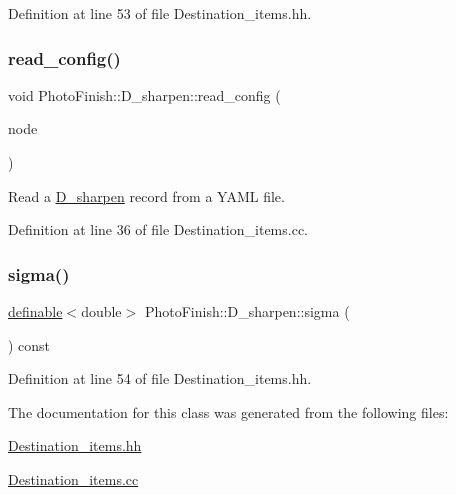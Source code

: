 Definition at line 53 of file Destination\+\_\+items.\+hh.

\mbox{\label{class_photo_finish_1_1_d__sharpen_a625cbe961ba438104d80d18779abc964}} 
\subsubsection{\texorpdfstring{read\+\_\+config()}{read\_config()}}
{\footnotesize\ttfamily void Photo\+Finish\+::\+D\+\_\+sharpen\+::read\+\_\+config (\begin{DoxyParamCaption}\item[{const Y\+A\+M\+L\+::\+Node \&}]{node }\end{DoxyParamCaption})}



Read a \hyperlink{class_photo_finish_1_1_d__sharpen}{D\+\_\+sharpen} record from a Y\+A\+ML file. 



Definition at line 36 of file Destination\+\_\+items.\+cc.

\mbox{\label{class_photo_finish_1_1_d__sharpen_a71a1ab086c5818f51e9d501ab6f086a5}} 
\subsubsection{\texorpdfstring{sigma()}{sigma()}}
{\footnotesize\ttfamily \hyperlink{class_photo_finish_1_1definable}{definable}$<$double$>$ Photo\+Finish\+::\+D\+\_\+sharpen\+::sigma (\begin{DoxyParamCaption}\item[{void}]{ }\end{DoxyParamCaption}) const\hspace{0.3cm}{\ttfamily [inline]}}



Definition at line 54 of file Destination\+\_\+items.\+hh.



The documentation for this class was generated from the following files\+:\begin{DoxyCompactItemize}
\item 
\hyperlink{_destination__items_8hh}{Destination\+\_\+items.\+hh}\item 
\hyperlink{_destination__items_8cc}{Destination\+\_\+items.\+cc}\end{DoxyCompactItemize}
